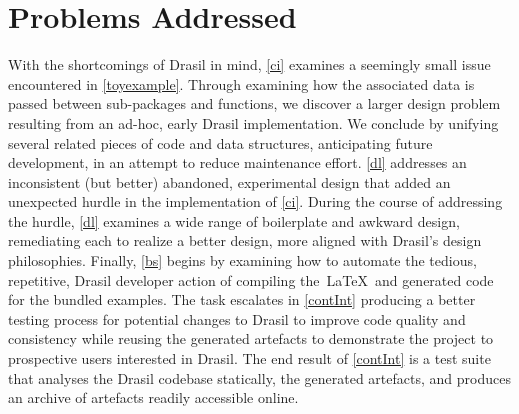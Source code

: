 \section{Problems Addressed}\label{iplan}
With the shortcomings of Drasil in mind, \autoref{ci} examines a seemingly small issue encountered in \autoref{toyexample}. Through examining how the associated data is passed between sub-packages and functions, we discover a larger design problem resulting from an ad-hoc, early Drasil implementation. We conclude by unifying several related pieces of code and data structures, anticipating future development, in an attempt to reduce maintenance effort. \autoref{dl} addresses an inconsistent (but better) abandoned, experimental design that added an unexpected hurdle in the implementation of \autoref{ci}. During the course of addressing the hurdle, \autoref{dl} examines a wide range of boilerplate and awkward design, remediating each to realize a better design, more aligned with Drasil's design philosophies. Finally, \autoref{bs} begins by examining how to automate the tedious, repetitive, Drasil developer action of compiling the\ \LaTeX\ and generated code for the bundled examples. The task escalates in \autoref{contInt} producing a better testing process for potential changes to Drasil to improve code quality and consistency while reusing the generated artefacts to demonstrate the project to prospective users interested in Drasil. The end result of \autoref{contInt} is a test suite that analyses the Drasil codebase statically, the generated artefacts, and produces an archive of artefacts readily accessible online.
